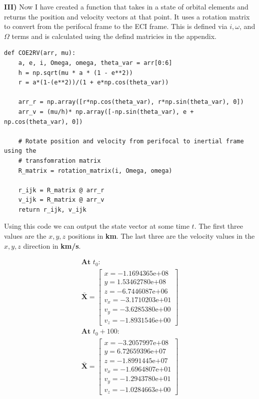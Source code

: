 \documentclass[12pt,twocolumn]{article}  %
\begin{document}
\vspace{0.5cm}
\noindent \textbf{III)} Now I have created a function that takes in a state of orbital elements and returns 
the position and velocity vectors at that point. It uses a rotation matrix to convert from 
the perifocal frame to the ECI frame. This is defined via $i, \omega$, and $\Omega$ terms and is 
calculated using the defind matricies in the appendix.
\begin{lstlisting}   
def COE2RV(arr, mu):
    a, e, i, Omega, omega, theta_var = arr[0:6]
    h = np.sqrt(mu * a * (1 - e**2))
    r = a*(1-(e**2))/(1 + e*np.cos(theta_var))

    arr_r = np.array([r*np.cos(theta_var), r*np.sin(theta_var), 0])
    arr_v = (mu/h)* np.array([-np.sin(theta_var), e + np.cos(theta_var), 0])

    # Rotate position and velocity from perifocal to inertial frame using the 
    # transfomration matrix
    R_matrix = rotation_matrix(i, Omega, omega)

    r_ijk = R_matrix @ arr_r
    v_ijk = R_matrix @ arr_v
    return r_ijk, v_ijk
\end{lstlisting}
\vspace{-0.35cm}
Using this code we can output the state vector at some time $t$. The first three values 
are the $x,y,z$ positions in \textbf{km}. The last three are the velocity values in the $x,y,z$ direction 
in \textbf{km/s}.

\[
\begin{array}{c}
\textbf{At } t_0: \\
\mathbf{\bar{X}} =
\begin{bmatrix}
x = -1.1694365\mathrm{e}{+08} \\
y =  1.53462780\mathrm{e}{+08} \\
z = -6.7446087\mathrm{e}{+06} \\
v_x = -3.1710203\mathrm{e}{+01} \\
v_y = -3.6285380\mathrm{e}{+00} \\
v_z = -1.8931546\mathrm{e}{+00}
\end{bmatrix}
\\[7em] %
\textbf{At } t_0 + 100: \\
\mathbf{\bar{X}} =
\begin{bmatrix}
x = -3.2057997\mathrm{e}{+08} \\
y =  6.72659396\mathrm{e}{+07} \\
z = -1.8991445\mathrm{e}{+07} \\
v_x = -1.6964807\mathrm{e}{+01} \\
v_y = -1.2943780\mathrm{e}{+01} \\
v_z = -1.0284663\mathrm{e}{+00}
\end{bmatrix}
\end{array}
\]
\end{document}
